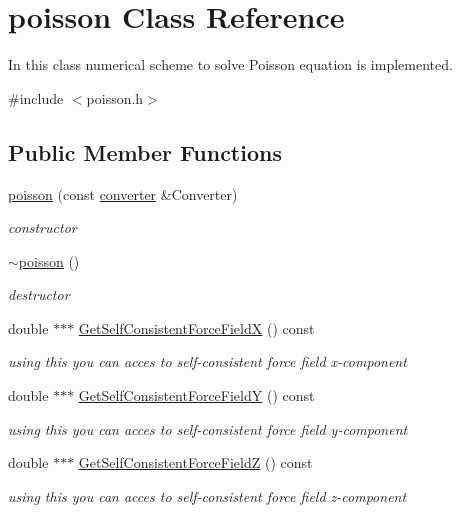 \hypertarget{classpoisson}{}\section{poisson Class Reference}
\label{classpoisson}


In this class numerical scheme to solve Poisson equation is implemented.  




{\ttfamily \#include $<$poisson.\+h$>$}

\subsection*{Public Member Functions}
\begin{DoxyCompactItemize}
\item 
\mbox{\hyperlink{classpoisson_a747dc597f8b38040bde8e40fc47054b4}{poisson}} (const \mbox{\hyperlink{classconverter}{converter}} \&Converter)
\begin{DoxyCompactList}\small\item\em constructor \end{DoxyCompactList}\item 
\mbox{\hyperlink{classpoisson_abcc4fdb354830a10fb4e2e42a5fad718}{$\sim$poisson}} ()
\begin{DoxyCompactList}\small\item\em destructor \end{DoxyCompactList}\item 
double $\ast$$\ast$$\ast$ \mbox{\hyperlink{classpoisson_ac0aa69f7fc50385430fe4e4b90ad452e}{Get\+Self\+Consistent\+Force\+FieldX}} () const
\begin{DoxyCompactList}\small\item\em using this you can acces to self-\/consistent force field x-\/component \end{DoxyCompactList}\item 
double $\ast$$\ast$$\ast$ \mbox{\hyperlink{classpoisson_abab1829dc556d57c2a156b6954dcc219}{Get\+Self\+Consistent\+Force\+FieldY}} () const
\begin{DoxyCompactList}\small\item\em using this you can acces to self-\/consistent force field y-\/component \end{DoxyCompactList}\item 
double $\ast$$\ast$$\ast$ \mbox{\hyperlink{classpoisson_ac0891df30c3686bc0d8bef48cade2b62}{Get\+Self\+Consistent\+Force\+FieldZ}} () const
\begin{DoxyCompactList}\small\item\em using this you can acces to self-\/consistent force field z-\/component \end{DoxyCompactList}\item 

\end{DoxyCompactItemize}
